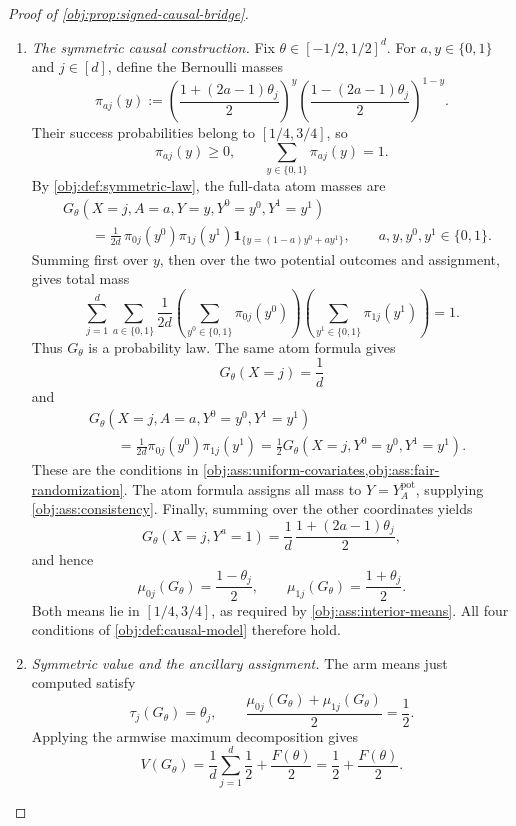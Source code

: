 \documentclass[11pt]{article}
\begin{document}
\begin{proof}[Proof of \cref{obj:prop:signed-causal-bridge}]
\begin{enumerate}
\item \emph{The symmetric causal construction.}
Fix \(\theta\in[-1/2,1/2]^d\). For
\(a,y\in\{0,1\}\) and \(j\in[d]\), define the Bernoulli masses
\[
\pi_{aj}(y)
:=
\left(\frac{1+(2a-1)\theta_j}{2}\right)^y
\left(\frac{1-(2a-1)\theta_j}{2}\right)^{1-y}.
\]
Their success probabilities belong to \([1/4,3/4]\), so
\[
\pi_{aj}(y)\ge0,
\qquad
\sum_{y\in\{0,1\}}\pi_{aj}(y)=1.
\]
By \cref{obj:def:symmetric-law}, the full-data atom masses are
\[
\begin{aligned}
&G_\theta(X=j,A=a,Y=y,Y^0=y^0,Y^1=y^1)\\
&\qquad=\frac1{2d}\,
\pi_{0j}(y^0)\pi_{1j}(y^1)
\mathbf1_{\{y=(1-a)y^0+ay^1\}},
\qquad a,y,y^0,y^1\in\{0,1\}.
\end{aligned}
\]
Summing first over \(y\), then over the two potential outcomes and
assignment, gives total mass
\[
\sum_{j=1}^d\sum_{a\in\{0,1\}}\frac1{2d}
\left(\sum_{y^0\in\{0,1\}}\pi_{0j}(y^0)\right)
\left(\sum_{y^1\in\{0,1\}}\pi_{1j}(y^1)\right)
=1.
\]
Thus \(G_\theta\) is a probability law. The same atom formula gives
\[
G_\theta(X=j)=\frac1d
\]
and
\[
\begin{aligned}
&G_\theta(X=j,A=a,Y^0=y^0,Y^1=y^1)\\
&\qquad=\frac1{2d}\pi_{0j}(y^0)\pi_{1j}(y^1)
=\frac12G_\theta(X=j,Y^0=y^0,Y^1=y^1).
\end{aligned}
\]
These are the conditions in
\cref{obj:ass:uniform-covariates,obj:ass:fair-randomization}.
The atom formula assigns all mass to \(Y=Y_A^{\mathrm{pot}}\), supplying
\cref{obj:ass:consistency}. Finally, summing over the other coordinates yields
\[
G_\theta(X=j,Y^a=1)
=\frac1d\,\frac{1+(2a-1)\theta_j}{2},
\]
and hence
\[
\mu_{0j}(G_\theta)=\frac{1-\theta_j}{2},
\qquad
\mu_{1j}(G_\theta)=\frac{1+\theta_j}{2}.
\]
Both means lie in \([1/4,3/4]\), as required by
\cref{obj:ass:interior-means}. All four conditions of
\cref{obj:def:causal-model} therefore hold.

\item \emph{Symmetric value and the ancillary assignment.}
The arm means just computed satisfy
\[
\tau_j(G_\theta)=\theta_j,
\qquad
\frac{\mu_{0j}(G_\theta)+\mu_{1j}(G_\theta)}2=\frac12.
\]
Applying the armwise maximum decomposition gives
\[
V(G_\theta)
=\frac1d\sum_{j=1}^d\frac12+\frac{F(\theta)}2
=\frac12+\frac{F(\theta)}2.
\]


\end{enumerate}
\end{proof}
\end{document}

